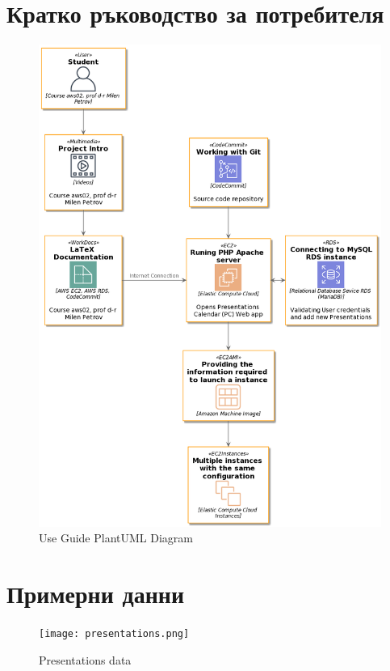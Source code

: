\documentclass[12pt]{article}
\begin{document}
\section{Кратко ръководство за потребителя}
\begin{figure}[h!]
\centering
    \includegraphics[scale=0.4]{diagram.png}
  \caption{Use Guide PlantUML Diagram}
\end{figure}

\newpage

\section{Примерни данни}
\begin{figure}[h!]
\centering
    \texttt{[image: presentations.png]}
  \caption{Presentations data}
\end{figure}

\medskip
\end{document}

